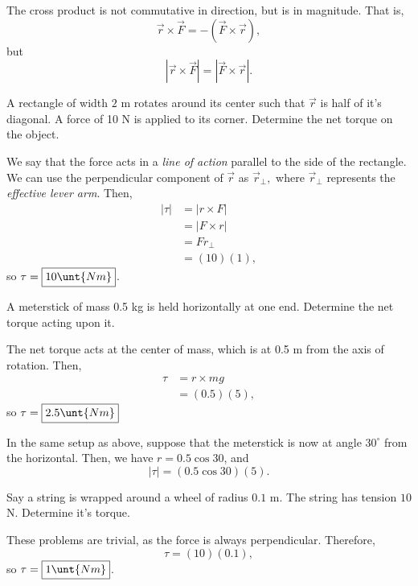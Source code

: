 \documentclass[11pt]{article}
\begin{document}
\begin{thrm}
	The cross product is not commutative in direction, but is in magnitude. That is,
	\[\vec{r}\times\vec{F} = -(\vec{F}\times \vec{r}),\]
	but
	\[|\vec{r}\times\vec{F}| = |\vec{F}\times\vec{r}|.\]
\end{thrm}
\begin{example}
	A rectangle of width $2$ m rotates around its center such that $\vec{r}$ is half of it's diagonal. A force of 10 N is applied to its corner. Determine the net torque on the object.
\end{example}
\begin{solution}
	We say that the force acts in a \textit{line of action} parallel to the side of the rectangle. We can use the perpendicular component of $\vec{r}$ as $\vec{r}_{\perp},$ where $\vec{r}_{\perp}$ represents the \textit{effective lever arm}. Then,
	\begin{align*}
		|\tau| &= |r\times F| \\
		&= |F\times r| \\
		&= Fr_{\perp} \\
		&= (10)(1),
	\end{align*}
	so $\tau = \boxed{10\unt{Nm}}$.
\end{solution}

\begin{example}
	A meterstick of mass 0.5 kg is held horizontally at one end. Determine the net torque acting upon it.
\end{example}
\begin{solution}
	The net torque acts at the center of mass, which is at 0.5 m from the axis of rotation. Then,
	\begin{align*}
		\tau &= r\times mg \\
		&= (0.5)(5),
	\end{align*}
	so $\tau = \boxed{2.5\unt{Nm}}$
\end{solution}

\medskip

\noindent In the same setup as above, suppose that the meterstick is now at angle $30^{\circ}$ from the horizontal. Then, we have $r = 0.5\cos30$, and
\[|\tau| = (0.5\cos30)(5).\]
\begin{example}
	Say a string is wrapped around a wheel of radius $0.1$ m. The string has tension $10$ N. Determine it's torque.
\end{example}
\begin{solution}
	These problems are trivial, as the force is always perpendicular. Therefore,
	\[\tau = (10)(0.1),\]
	so $\tau = \boxed{1\unt{Nm}}$.
\end{solution}
\end{document}
